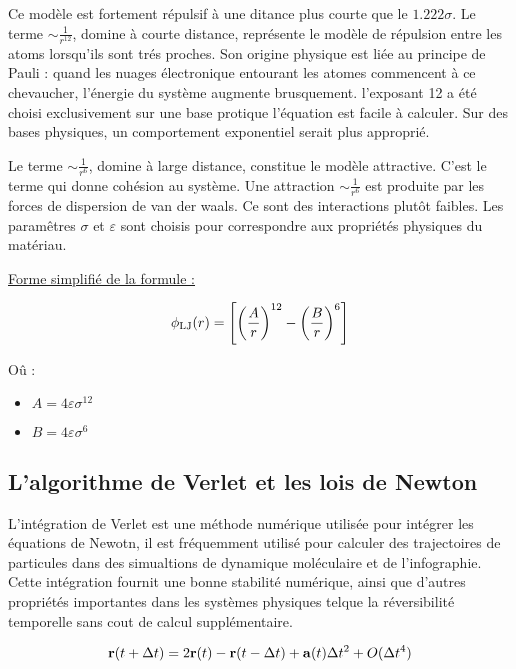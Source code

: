 Ce modèle est fortement répulsif à une ditance plus courte que le $1.222 \sigma$.
Le terme  $\sim \frac{1}{r^{12}}$, domine à courte distance, représente le modèle de répulsion entre les atoms lorsqu'ils sont trés proches. Son origine physique est liée au principe de Pauli :  quand les nuages électronique entourant les atomes commencent à ce chevaucher, l'énergie du système augmente brusquement. l'exposant 12 a été choisi exclusivement sur une base protique l'équation est facile à calculer. Sur des bases physiques, un comportement exponentiel serait plus approprié.

Le terme   $\sim \frac{1}{r^{6}}$, domine à large distance, constitue le modèle attractive. C'est le terme qui donne cohésion au système. Une attraction  $\sim \frac{1}{r^{6}}$ est produite par les forces de dispersion de van der waals. Ce sont des interactions plutôt faibles. 
Les paramêtres $\sigma$ et $\varepsilon$ sont choisis pour correspondre aux propriétés physiques du matériau.

\underline{Forme simplifié de la formule :}


 \begin{displaymath} 
 \phi_{\rm LJ} (r) =  \left[ \left(\frac{A}{r}\right)^{12} - \left(\frac{B}{r}\right)^{6} \right]\end{displaymath}

Oû : 
\begin{itemize}
    \item $ A = 4 \varepsilon \sigma ^{12}$
    \item $ B = 4 \varepsilon \sigma ^{6}$
\end{itemize}

\subsection{L'algorithme de Verlet et les lois de Newton}

L'intégration de Verlet est une méthode numérique utilisée pour intégrer les équations de Newotn, il est fréquemment utilisé pour calculer des trajectoires de particules dans des simualtions de dynamique moléculaire et de l'infographie.
Cette intégration fournit une bonne stabilité numérique, ainsi que d'autres propriétés importantes dans les systèmes physiques telque la réversibilité temporelle sans cout de calcul supplémentaire.

\begin{displaymath} {\bf r} (t+\Delta t) = 2{\bf r} (t) - {\bf r} (t-\Delta t) + {\bf a} (t) \Delta t^2 + O(\Delta t^4) \end{displaymath}

